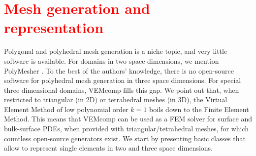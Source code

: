 \documentclass[a4paper]{article}
\newcommand{\red}[1]{\textcolor{red}{#1}}
\begin{document}
\section{\red{Mesh generation and representation}}
\label{sec:mesh_generation}


Polygonal and polyhedral mesh generation is a niche topic, and very little software is available.  For domains in two space dimensions, we mention PolyMesher \cite{Talischi_2012}. To the best of the authors' knowledge, there is no open-source software for polyhedral mesh generation in three space dimensions. For special three dimensional domains,  VEMcomp fills this gap. We point out that, when restricted to triangular (in 2D) or tetrahedral meshes (in 3D), the Virtual Element Method of low polynomial order $k=1$ boils down to the Finite Element Method. This means that VEMcomp can be used as a FEM solver for surface and bulk-surface PDEs, when provided with triangular/tetrahedral meshes,  for which countless open-source generators exist.  We start by presenting basic classes that allow to represent single elements in two and three space dimensions. 
\end{document}
